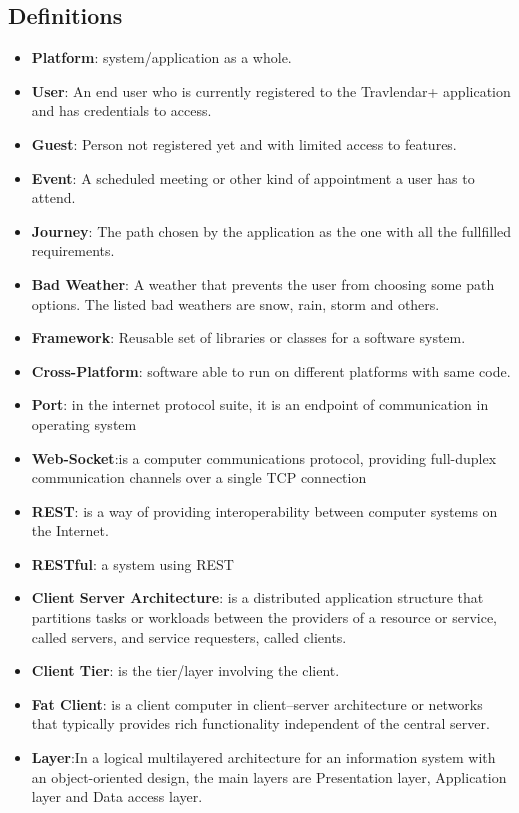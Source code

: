 \documentclass[numbers=noenddot, 12pt, a4paper, oneside]{scrbook}
\begin{document}
\subsection*{Definitions}
\begin{itemize}
	\item \textbf{Platform}: system/application as a whole.
	\item \textbf{User}: An end user who is currently registered to the Travlendar+ application and has credentials to access.
	\item \textbf{Guest}: Person not registered yet and with limited access to features.
	\item \textbf{Event}: A scheduled meeting or other kind of appointment a user has to attend.
	\item \textbf{Journey}: The path chosen by the application as the one with all the fullfilled requirements.
	\item \textbf{Bad Weather}: A weather that prevents the user from choosing some path options. The listed bad weathers are snow, rain, storm and others.
	\item \textbf{Framework}: Reusable set of libraries or classes for a software system.
	\item \textbf{Cross-Platform}: software able to run on different platforms with same code.
	\item \textbf{Port}: in the internet protocol suite, it is an endpoint of communication in operating system
	\item \textbf{Web-Socket}:is a computer communications protocol, providing full-duplex communication channels over a single TCP connection
	\item \textbf{REST}: is a way of providing interoperability between computer systems on the Internet.
	\item \textbf{RESTful}: a system using REST
	\item \textbf{Client Server Architecture}:  is a distributed application structure that partitions tasks or workloads between the providers of a resource or service, called servers, and service requesters, called clients.
	\item \textbf{Client Tier}: is the tier/layer involving the client.
	\item \textbf{Fat Client}: is a client computer in client–server architecture or networks that typically provides rich functionality independent of the central server.
	\item \textbf{Layer}:In a logical multilayered architecture for an information system with an object-oriented design, the main layers are Presentation layer, Application layer and Data access layer.
\end{itemize}
\end{document}
